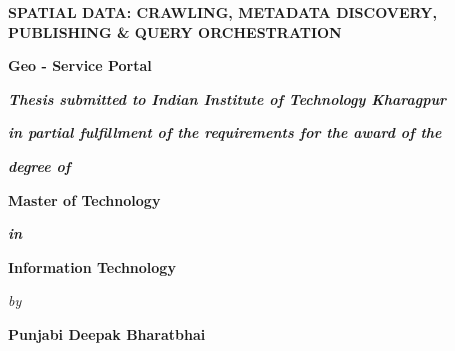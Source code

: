 \thispagestyle{empty}
\begin{center}
\textbf{ \LARGE{SPATIAL DATA: CRAWLING, METADATA DISCOVERY, PUBLISHING \& QUERY ORCHESTRATION} }
\end{center}
 \vspace{-2.5em}
\begin{center}
\end{center}
 \vspace{-2.5em}
\begin{center}
\textbf{\large Geo - Service Portal }\\
\end{center}
 \vspace{2em}
\begin{center}
 \textbf{\textit{Thesis submitted to Indian Institute of Technology Kharagpur}} 
\end{center}
 \vspace{-3em}
\begin{center}
 \textbf{\textit{in partial fulfillment of the requirements for the award of the }} 
\end{center}
 \vspace{-3em}
\begin{center}
 \textbf{\textit{degree of}}
\end{center}
 \vspace{-1em}
\begin{center}
 \textbf{ Master of Technology}
\end{center}
\vspace{-3em}
\begin{center}
 \textbf{\textit{in}}
\end{center}
 \vspace{-3em}
\begin{center}
 \textbf{{Information Technology}}
\end{center}
 \vspace{-3em}
\begin{center}
 \textit{by}
\end{center}
 \vspace{-1em}
\begin{center}
 \large{\textbf{Punjabi Deepak Bharatbhai}}
\end{center}
